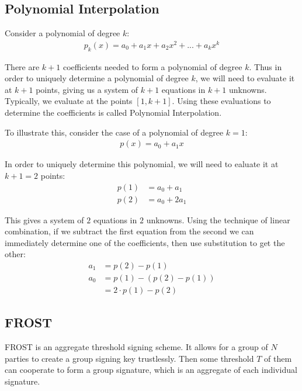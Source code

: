 \documentclass{article}
\begin{document}
\subsection{
  Polynomial Interpolation
}

Consider a polynomial of degree $k$:
\begin{align}
  p_k(x) = a_0 + a_1 x + a_2 x^2 + ... + a_k x^k
\end{align}

There are $k+1$ coefficients needed to form a polynomial of degree $k$.  Thus in order to uniquely determine a polynomial of degree $k$, we will need to evaluate it at $k+1$ points, giving us a system of $k+1$ equations in $k+1$ unknowns.  Typically, we evaluate at the points $[1, k+1]$.  Using these evaluations to determine the coefficients is called Polynomial Interpolation.

To illustrate this, consider the case of a polynomial of degree $k = 1$:
\begin{align}
  p(x) = a_0 + a_1 x\nonumber
\end{align}

In order to uniquely determine this polynomial, we will need to ealuate it at $k+1 = 2$ points:
\begin{align}
  p(1) &= a_0 + a_1\nonumber\\
  p(2) &= a_0 + 2 a_1\nonumber
\end{align}

This gives a system of $2$ equations in $2$ unknowns.  Using the technique of linear combination, if we subtract the first equation from the second we can immediately determine one of the coefficients, then use substitution to get the other:
\begin{align}
  a_1 &= p(2) - p(1)\nonumber\\
  a_0 &= p(1) - (p(2) - p(1))\nonumber\\
      &= 2 \cdot p(1) - p(2)\nonumber
\end{align}

\newpage
\onecolumn
\subsection{
  FROST
}

FROST is an aggregate threshold signing scheme.  It allows for a group of $N$ parties to create a group signing key trustlessly.  Then some threshold $T$ of them can cooperate to form a group signature, which is an aggregate of each individual signature.
\end{document}
